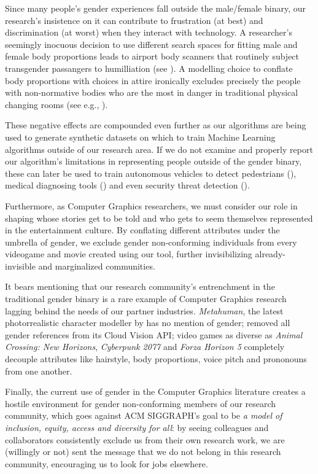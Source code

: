 \documentclass[sigconf,review,balance=false]{acmart}
\begin{document}
Since many people's gender experiences fall outside the male/female binary, our
research's insistence on it can contribute to frustration (at best) and
discrimination (at worst) when they interact with technology. A researcher's
seemingly inocuous decision to use different search spaces for fitting male and
female body proportions leads to airport body scanners that routinely subject
transgender passangers to humilliation (see \cite{tsa}). A modelling choice to
conflate body proportions with choices in attire ironically excludes precisely
the people with non-normative bodies who are the most in danger in traditional
physical changing rooms (see e.g., \cite{changingroom}). 


These negative effects are compounded even further as our algorithms are being
used to generate synthetic datasets on which to train Machine Learning
algorithms outside of our research area. If we do not examine and properly
report our algorithm's limitations in representing people outside of the gender
binary, these can later be used to train autonomous vehicles to detect
pedestrians (\cite{cars}), medical diagnosing tools (\cite{chen2021synthetic})
and even security threat detection (\cite{dhs}).

Furthermore, as Computer Graphics researchers, we must consider our role in
shaping whose stories get to be told and who gets to seem themselves represented
in the entertainment culture. By conflating different attributes under the
umbrella of gender, we exclude gender non-conforming individuals from every
videogame and movie created using our tool, further invisibilizing
already-invisible and marginalized communities.

It bears mentioning that our research community's entrenchment in the
traditional gender binary is a rare example of Computer Graphics research
lagging behind the needs of our partner industries. \emph{Metahuman}, the latest
photorrealistic character modeller by \citet{metahuman} has no mention of
gender; \citet{googlegender} removed all gender references from its Cloud Vision
API; video games as diverse as \emph{Animal Crossing: New Horizons},
\emph{Cyberpunk 2077} and \emph{Forza Horizon 5} completely decouple attributes
like hairstyle, body proportions, voice pitch and prononouns from one another. 

Finally, the current use of gender in the Computer Graphics literature creates a
hostile environment for gender non-conforming members of our research community,
which goes against ACM SIGGRAPH's goal to be \emph{a model of inclusion, equity,
access and diversity for all}:  by seeing colleagues and collaborators
consistently exclude us  from their own research work, we are (willingly or not)
sent the message that we do not belong in this research community, encouraging
us to look for jobs elsewhere.
\end{document}
